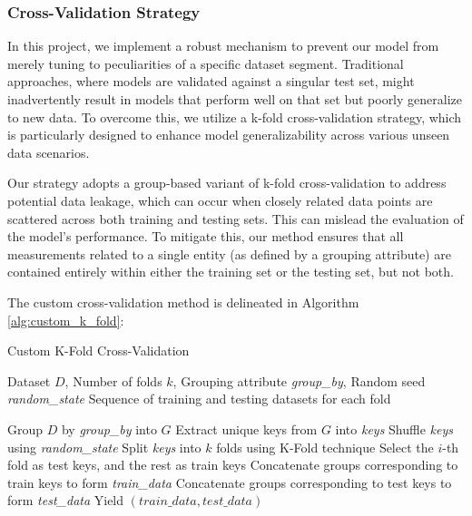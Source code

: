 \subsubsection{Cross-Validation Strategy}
In this project, we implement a robust mechanism to prevent our model from merely tuning to peculiarities of a specific dataset segment.
Traditional approaches, where models are validated against a singular test set, might inadvertently result in models that perform well on that set but poorly generalize to new data.
To overcome this, we utilize a k-fold cross-validation strategy, which is particularly designed to enhance model generalizability across various unseen data scenarios.

Our strategy adopts a group-based variant of k-fold cross-validation to address potential data leakage, which can occur when closely related data points are scattered across both training and testing sets.
This can mislead the evaluation of the model's performance.
To mitigate this, our method ensures that all measurements related to a single entity (as defined by a grouping attribute) are contained entirely within either the training set or the testing set, but not both.


The custom cross-validation method is delineated in Algorithm \ref{alg:custom_k_fold}: 

\begin{algorithm}[H]
\caption{Custom K-Fold Cross-Validation}
\label{alg:custom_k_fold}
\begin{algorithmic}[1]
\Require Dataset $D$, Number of folds $k$, Grouping attribute \textit{group\_by}, Random seed \textit{random\_state}
\Ensure Sequence of training and testing datasets for each fold

\State Group $D$ by \textit{group\_by} into $G$ \label{line:group}
\State Extract unique keys from $G$ into \textit{keys} \label{line:extract_keys}
\State Shuffle \textit{keys} using \textit{random\_state} \label{line:shuffle}
\State Split \textit{keys} into $k$ folds using K-Fold technique \label{line:split}
    \State Select the $i$-th fold as test keys, and the rest as train keys \label{line:select_keys}
    \State Concatenate groups corresponding to train keys to form \textit{train\_data} \label{line:concatenate_train}
    \State Concatenate groups corresponding to test keys to form \textit{test\_data} \label{line:concatenate_test}
    \State Yield $(\textit{train\_data}, \textit{test\_data})$ \label{line:yield}
\EndFor
\end{algorithmic}
\end{algorithm}

